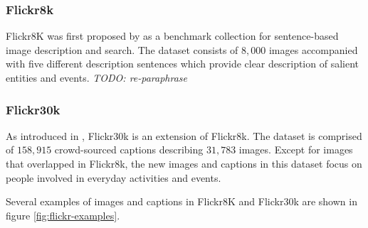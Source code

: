 \subsubsection{Flickr8k}
Flickr8K was first proposed by \cite{Hodosh:2013:FID:2566972.2566993} as a benchmark collection for sentence-based image description and search. The dataset consists of $8,000$ images accompanied with five different description sentences which provide clear description of salient entities and events. \textit{TODO: re-paraphrase}
\subsubsection{Flickr30k}
As introduced in \cite{DBLP:journals/tacl/YoungLHH14}, Flickr30k is an extension of Flickr8k. The dataset is comprised of $158,915$ crowd-sourced captions describing $31,783$ images. Except for images that overlapped in Flickr8k, the new images and captions in this dataset focus on people involved in everyday activities and events.

Several examples of images and captions in Flickr8K and Flickr30k are shown in figure \ref{fig:flickr-examples}.

